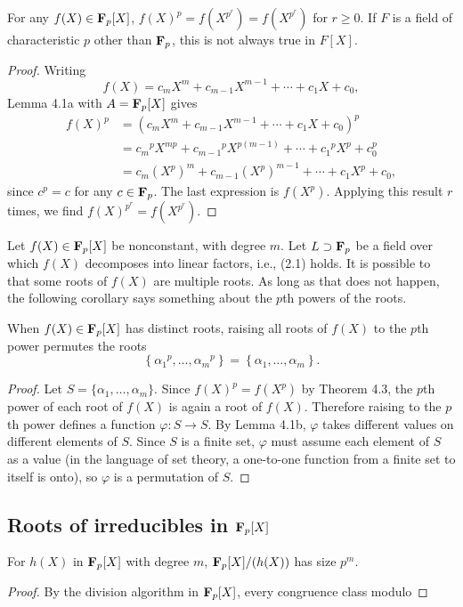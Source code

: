 \begin{theorem}
  For any $f(X)\in\mathbf{F}_p[X]$, $f(X)^p=f(X^{p^r})=f(X^{p^r})$ for $r\geq
  0$. If $F$ is a field of characteristic $p$ other than $\mathbf{F}_p$, this is
  not always true in $F[X]$.
\end{theorem}
\begin{proof}
  Writing
  \[
    f(X)=c_mX^m+c_{m-1}X^{m-1}+\cdots+c_1X+c_0,
  \]
  Lemma 4.1a with $A=\mathbf{F}_p[X]$ gives
  \begin{align*}
    f(X)^p
    &=\left( c_mX^m+c_{m-1}X^{m-1}+\cdots+c_1X+c_0 \right)^p\\
    &={c_m}^pX^{mp}+{c_{m-1}}^pX^{p(m-1)}+\cdots+{c_1}^pX^p+c_0^p\\
    &=c_m{(X^p)}^m+c_{m-1}{(X^p)}^{m-1}+\cdots+c_1X^p+c_0,
  \end{align*}
  since $c^p=c$ for any $c\in\mathbf{F}_p$. The last expression is
  $f(X^p)$. Applying this result $r$ times, we find
  $f(X)^{p^r}=f(X^{p^r})$.
\end{proof}

Let $f(X)\in\mathbf{F}_p[X]$ be nonconstant, with degree $m$. Let
$L\supset\mathbf{F}_p$ be a field over which $f(X)$ decomposes into linear
factors, i.e., (2.1) holds. It is possible to that some roots of $f(X)$ are
multiple roots. As long as that does not happen, the following corollary
says something about the $p$th powers of the roots.

\begin{corollary}
  When $f(X)\in\mathbf{F}_p[X]$ has distinct roots, raising all roots of $f(X)$
  to the $p$th power permutes the roots
  \[
    \left\{{\alpha_1}^p,\ldots,{\alpha_m}^p\right\}=\left\{{\alpha_1},\ldots,{\alpha_m}\right\}.
  \]
\end{corollary}
\begin{proof}
  Let $S=\{\alpha_1,\ldots,\alpha_m\}$. Since $f(X)^p=f(X^p)$ by Theorem
  4.3, the $p$th power of each root of $f(X)$ is again a root of
  $f(X)$. Therefore raising to the $p$th power defines a function
  $\varphi\colon S\to S$. By Lemma 4.1b, $\varphi$ takes different values
  on different elements of $S$. Since $S$ is a finite set, $\varphi$ must
  assume each element of $S$ as a value (in the language of set theory, a
  one-to-one function from a finite set to itself is onto), so $\varphi$ is
  a permutation of $S$.
\end{proof}

\subsection[Roots of irreducibles in FpX]{Roots of irreducibles in
  $\mathbf{F}_p[X]$}
\begin{lemma}
  For $h(X)$ in $\mathbf{F}_p[X]$ with degree $m$, $\mathbf{F}_p[X]/(h(X))$ has size
  $p^m$.
\end{lemma}
\begin{proof}
  By the division algorithm in $\mathbf{F}_p[X]$, every congruence class modulo
\end{proof}


